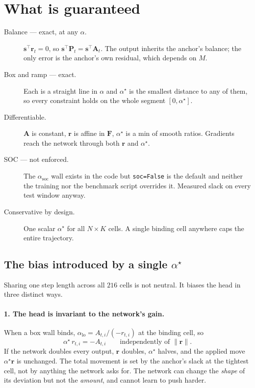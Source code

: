 \documentclass[11pt]{article}
\begin{document}
\section{What is guaranteed}

\begin{description}
\item[Balance --- exact, at any $\alpha$.] $\mathbf{s}^{\!\top}\mathbf{r}_t=0$,
      so $\mathbf{s}^{\!\top}\mathbf{P}_t=\mathbf{s}^{\!\top}\mathbf{A}_t$. The
      output inherits the anchor's balance; the only error is the anchor's own
      residual, which depends on $M$.
\item[Box and ramp --- exact.] Each is a straight line in $\alpha$ and
      $\alpha^{\star}$ is the smallest distance to any of them, so every
      constraint holds on the whole segment $[0,\alpha^{\star}]$.
\item[Differentiable.] $\mathbf{A}$ is constant, $\mathbf{r}$ is affine in
      $\mathbf{F}$, $\alpha^{\star}$ is a min of smooth ratios. Gradients reach
      the network through both $\mathbf{r}$ and $\alpha^{\star}$.
\item[SOC --- not enforced.] The $\alpha_{\mathrm{soc}}$ wall exists in the code
      but \texttt{soc=False} is the default and neither the training nor the
      benchmark script overrides it. Measured slack on every test window anyway.
\item[Conservative by design.] One scalar $\alpha^{\star}$ for all $N\times K$
      cells. A single binding cell anywhere caps the entire trajectory.
\end{description}

\subsection*{The bias introduced by a single $\alpha^{\star}$}

Sharing one step length across all $216$ cells is not neutral. It biases the
head in three distinct ways.

\paragraph{1. The head is invariant to the network's gain.} When a box wall
binds, $\alpha_{\mathrm{lo}}=A_{t,i}/(-r_{t,i})$ at the binding cell, so
\[
\alpha^{\star}\,r_{t,i}=-A_{t,i}
\qquad\text{independently of }\|\mathbf{r}\| .
\]
If the network doubles every output, $\mathbf{r}$ doubles, $\alpha^{\star}$
halves, and the applied move $\alpha^{\star}\mathbf{r}$ is unchanged. The total
movement is set by the anchor's slack at the tightest cell, not by anything the
network asks for. The network can change the \emph{shape} of its deviation but
not the \emph{amount}, and cannot learn to push harder.
\end{document}
